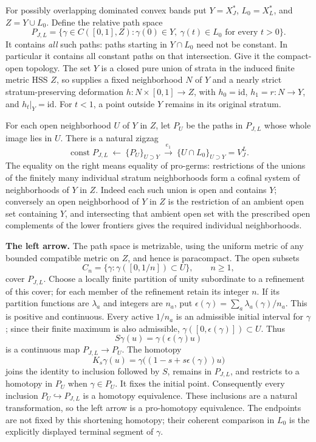 For possibly overlapping dominated convex bands put
\(Y=X_J^*\), \(L_0=X_L^*\), and \(Z=Y\cup L_0\). Define the relative path space
\[
 P_{J,L}=\{\gamma\in C([0,1],Z):\gamma(0)\in Y,
                    \ \gamma(t)\in L_0\text{ for every }t>0\}.
\]
It contains \emph{all} such paths: paths starting in \(Y\cap L_0\) need not be constant. In particular it contains all constant paths on that intersection. Give it the compact-open topology. The set \(Y\) is a closed pure union of strata in the induced finite metric HSS \(Z\), so \cite[Proposition 3.2]{Quinn1988} supplies a fixed neighborhood \(N\) of \(Y\) and a nearly strict stratum-preserving deformation
\(h:N\times[0,1]\to Z\), with \(h_0=\mathrm{id}\), \(h_1=r:N\to Y\), and \(h_t|_Y=\mathrm{id}\). For \(t<1\), a point outside \(Y\) remains in its original stratum.

For each open neighborhood \(U\) of \(Y\) in \(Z\), let \(P_U\) be the paths in \(P_{J,L}\) whose whole image lies in \(U\). There is a natural zigzag
\[
 \operatorname{const} P_{J,L}
 \ \longleftarrow\ \{P_U\}_{U\supset Y}
 \ \xrightarrow{e_1}\ \{U\cap L_0\}_{U\supset Y}=V_J^L.
\]
The equality on the right means equality of pro-germs: restrictions of the unions of the finitely many individual stratum neighborhoods form a cofinal system of neighborhoods of \(Y\) in \(Z\). Indeed each such union is open and contains \(Y\); conversely an open neighborhood of \(Y\) in \(Z\) is the restriction of an ambient open set containing \(Y\), and intersecting that ambient open set with the prescribed open complements of the lower frontiers gives the required individual neighborhoods.

\textbf{The left arrow.} The path space is metrizable, using the uniform metric of any bounded compatible metric on \(Z\), and hence is paracompact. The open subsets
\[
 C_n=\{\gamma:\gamma([0,1/n])\subset U\},\qquad n\ge1,
\]
cover \(P_{J,L}\). Choose a locally finite partition of unity subordinate to a refinement of this cover; for each member of the refinement retain its integer \(n\). If its partition functions are \(\lambda_a\) and integers are \(n_a\), put
\(\epsilon(\gamma)=\sum_a\lambda_a(\gamma)/n_a\).
This is positive and continuous. Every active \(1/n_a\) is an admissible initial interval for \(\gamma\); since their finite maximum is also admissible, \(\gamma([0,\epsilon(\gamma)])\subset U\). Thus
\[
 S\gamma(u)=\gamma(\epsilon(\gamma)u)
\]
is a continuous map \(P_{J,L}\to P_U\). The homotopy
\[
 K_s\gamma(u)=\gamma\bigl((1-s+s\epsilon(\gamma))u\bigr)
\]
joins the identity to inclusion followed by \(S\), remains in \(P_{J,L}\), and restricts to a homotopy in \(P_U\) when \(\gamma\in P_U\). It fixes the initial point. Consequently every inclusion \(P_U\hookrightarrow P_{J,L}\) is a homotopy equivalence. These inclusions are a natural transformation, so the left arrow is a pro-homotopy equivalence. The endpoints are not fixed by this shortening homotopy; their coherent comparison in \(L_0\) is the explicitly displayed terminal segment of \(\gamma\).

